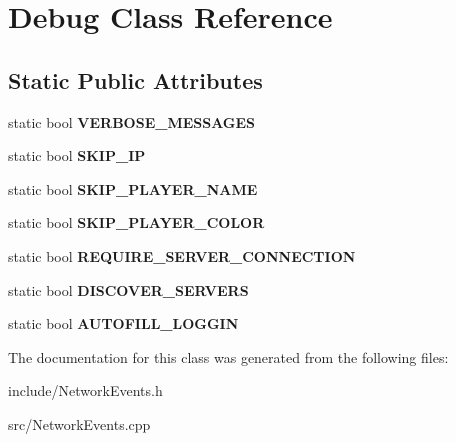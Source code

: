 \hypertarget{class_debug}{\section{Debug Class Reference}
\label{class_debug}
}
\subsection*{Static Public Attributes}
\begin{DoxyCompactItemize}
\item 
\hypertarget{class_debug_af06c4ace776dad3156eaa37bd386f0f8}{static bool {\bfseries V\-E\-R\-B\-O\-S\-E\-\_\-\-M\-E\-S\-S\-A\-G\-E\-S}}\label{class_debug_af06c4ace776dad3156eaa37bd386f0f8}

\item 
\hypertarget{class_debug_a5d5b459c68b28b410546379e25c91bec}{static bool {\bfseries S\-K\-I\-P\-\_\-\-I\-P}}\label{class_debug_a5d5b459c68b28b410546379e25c91bec}

\item 
\hypertarget{class_debug_ac7357fa85374be165694a32530b46f0d}{static bool {\bfseries S\-K\-I\-P\-\_\-\-P\-L\-A\-Y\-E\-R\-\_\-\-N\-A\-M\-E}}\label{class_debug_ac7357fa85374be165694a32530b46f0d}

\item 
\hypertarget{class_debug_a150b7ad4b8a768895bb356e60f31390e}{static bool {\bfseries S\-K\-I\-P\-\_\-\-P\-L\-A\-Y\-E\-R\-\_\-\-C\-O\-L\-O\-R}}\label{class_debug_a150b7ad4b8a768895bb356e60f31390e}

\item 
\hypertarget{class_debug_a3b12ed81242ef6ee0390865cb5863103}{static bool {\bfseries R\-E\-Q\-U\-I\-R\-E\-\_\-\-S\-E\-R\-V\-E\-R\-\_\-\-C\-O\-N\-N\-E\-C\-T\-I\-O\-N}}\label{class_debug_a3b12ed81242ef6ee0390865cb5863103}

\item 
\hypertarget{class_debug_a6fd4c486c8853758c1718ab77009ccd9}{static bool {\bfseries D\-I\-S\-C\-O\-V\-E\-R\-\_\-\-S\-E\-R\-V\-E\-R\-S}}\label{class_debug_a6fd4c486c8853758c1718ab77009ccd9}

\item 
\hypertarget{class_debug_a90eac41a770e6311a469e5bab925e180}{static bool {\bfseries A\-U\-T\-O\-F\-I\-L\-L\-\_\-\-L\-O\-G\-G\-I\-N}}\label{class_debug_a90eac41a770e6311a469e5bab925e180}

\end{DoxyCompactItemize}


The documentation for this class was generated from the following files\-:\begin{DoxyCompactItemize}
\item 
include/Network\-Events.\-h\item 
src/Network\-Events.\-cpp\end{DoxyCompactItemize}
